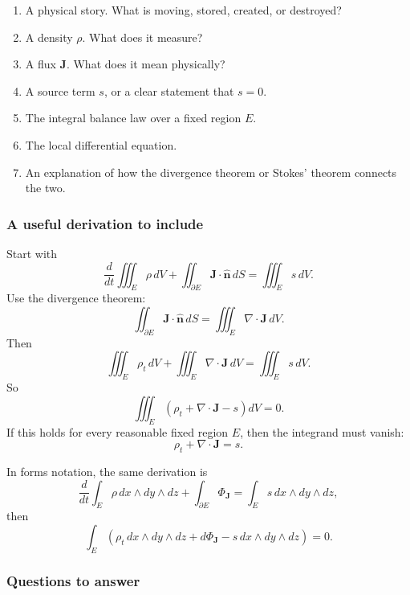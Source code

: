 \begin{enumerate}
\item A physical story.  What is moving, stored, created, or destroyed?

\item A density \(\rho\).  What does it measure?

\item A flux \(\mathbf J\).  What does it mean physically?

\item A source term \(s\), or a clear statement that \(s=0\).

\item The integral balance law over a fixed region \(E\).

\item The local differential equation.

\item An explanation of how the divergence theorem or Stokes' theorem connects the
two.
\end{enumerate}

\subsubsection*{A useful derivation to include}

Start with
\[
    \frac{d}{dt}\iiint_E \rho\,dV
    +
    \iint_{\partial E}\mathbf J\cdot\widehat{\mathbf n}\,dS
    =
    \iiint_E s\,dV.
\]
Use the divergence theorem:
\[
    \iint_{\partial E}\mathbf J\cdot\widehat{\mathbf n}\,dS
    =
    \iiint_E\nabla\cdot\mathbf J\,dV.
\]
Then
\[
    \iiint_E \rho_t\,dV
    +
    \iiint_E\nabla\cdot\mathbf J\,dV
    =
    \iiint_E s\,dV.
\]
So
\[
    \iiint_E
    \left(
        \rho_t+\nabla\cdot\mathbf J-s
    \right)dV=0.
\]
If this holds for every reasonable fixed region \(E\), then the integrand must vanish:
\[
\boxed{
    \rho_t+\nabla\cdot\mathbf J=s.
}
\]

In forms notation, the same derivation is
\[
    \frac{d}{dt}\int_E \rho\,dx\wedge dy\wedge dz
    +
    \int_{\partial E}\Phi_{\mathbf J}
    =
    \int_E s\,dx\wedge dy\wedge dz,
\]
then
\[
    \int_E
    \left(
        \rho_t\,dx\wedge dy\wedge dz
        +
        d\Phi_{\mathbf J}
        -
        s\,dx\wedge dy\wedge dz
    \right)=0.
\]

\subsubsection*{Questions to answer}

